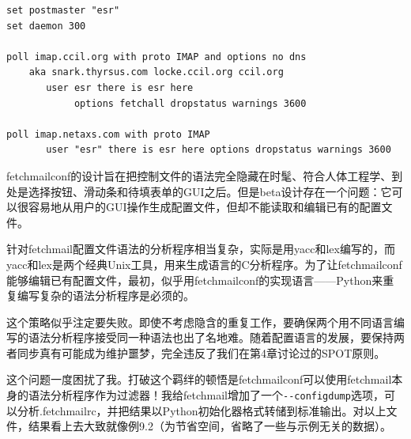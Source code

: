 \documentclass[12pt,oneside]{book}
\begin{document}
\begin{Verbatim}[label=例9.1 fetchmailrc语法示例]
set postmaster "esr"
set daemon 300

poll imap.ccil.org with proto IMAP and options no dns
    aka snark.thyrsus.com locke.ccil.org ccil.org
       user esr there is esr here 
            options fetchall dropstatus warnings 3600

poll imap.netaxs.com with proto IMAP
       user "esr" there is esr here options dropstatus warnings 3600
\end{Verbatim}

fetchmailconf的设计旨在把控制文件的语法完全隐藏在时髦、符合人体工程学、到处是选择按钮、滑动条和待填表单的GUI之后。但是beta设计存在一个问题：它可以很容易地从用户的GUI操作生成配置文件，但却不能读取和编辑已有的配置文件。

针对fetchmail配置文件语法的分析程序相当复杂，实际是用yacc和lex编写的，而yacc和lex是两个经典Unix工具，用来生成语言的C分析程序。为了让fetchmailconf能够编辑已有配置文件，最初，似乎用fetchmailconf的实现语言——Python来重复编写复杂的语法分析程序是必须的。

这个策略似乎注定要失败。即使不考虑隐含的重复工作，要确保两个用不同语言编写的语法分析程序接受同一种语法也出了名地难。随着配置语言的发展，要保持两者同步真有可能成为维护噩梦，完全违反了我们在第4章讨论过的SPOT原则。

这个问题一度困扰了我。打破这个羁绊的顿悟是fetchmailconf可以使用fetchmail本身的语法分析程序作为过滤器！我给fetchmail增加了一个\verb+--configdump+选项，可以分析.fetchmailrc，并把结果以Python初始化器格式转储到标准输出。对以上文件，结果看上去大致就像例9.2（为节省空间，省略了一些与示例无关的数据）。
\end{document}
